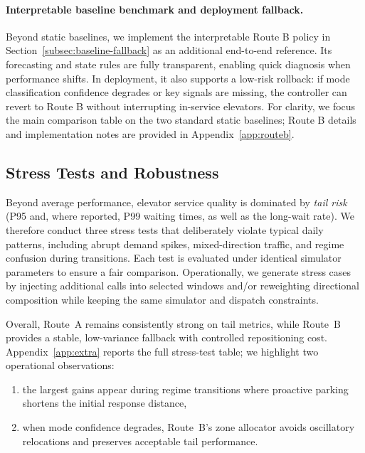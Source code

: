 \paragraph{Interpretable baseline benchmark and deployment fallback.}
Beyond static baselines, we implement the interpretable Route B policy in Section~\ref{subsec:baseline-fallback} as an additional
end-to-end reference. Its forecasting and state rules are fully transparent, enabling quick diagnosis when performance shifts.
In deployment, it also supports a low-risk rollback: if mode classification confidence degrades or key signals are missing, the controller
can revert to Route B without interrupting in-service elevators. For clarity, we focus the main comparison table on the two standard static baselines; Route B details and implementation notes are provided in Appendix~\ref{app:routeb}.

\subsection{Stress Tests and Robustness}
\label{subsec:stress}

Beyond average performance, elevator service quality is dominated by \emph{tail risk} (P95 and, where reported, P99 waiting times, as well as the long-wait rate).
We therefore conduct three stress tests that deliberately violate typical daily patterns, including abrupt demand spikes, mixed-direction
traffic, and regime confusion during transitions. Each test is evaluated under identical simulator parameters to ensure a fair comparison. 
Operationally, we generate stress cases by injecting additional calls into selected windows and/or reweighting directional composition while keeping the same simulator and dispatch constraints.


Overall, Route~A remains consistently strong on tail metrics, while Route~B provides a stable, low-variance fallback with controlled
repositioning cost. Appendix~\ref{app:extra} reports the full stress-test table; we highlight two operational observations:
\begin{enumerate}[label=(\alph*)]
    \item the largest gains appear during regime transitions where proactive parking shortens the initial response distance, 
    \item when mode confidence degrades, Route~B's zone allocator avoids oscillatory relocations and preserves acceptable tail performance.
\end{enumerate}

